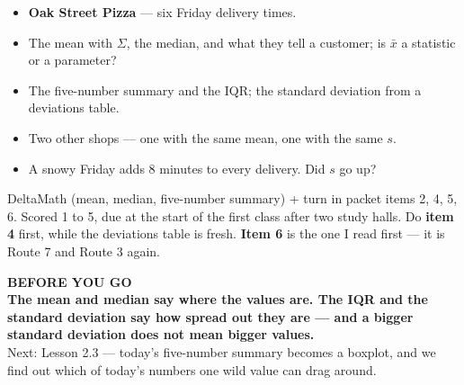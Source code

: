 \documentclass[aspectratio=169, 11pt]{beamer}
\begin{document}
\begin{frame}[t, plain]
  \begin{itemize}\setlength{\itemsep}{4pt}
    \item \textbf{Oak Street Pizza} --- six Friday delivery times.
    \item The mean with $\Sigma$, the median, and what they tell a customer; is $\bar{x}$ a
          statistic or a parameter?
    \item The five-number summary and the IQR; the standard deviation from a deviations table.
    \item Two other shops --- one with the same mean, one with the same $s$.
    \item A snowy Friday adds 8 minutes to every delivery. Did $s$ go up?
  \end{itemize}
  \begin{block}{DeltaMath (mean, median, five-number summary) + turn in packet items 2, 4, 5, 6. Scored 1 to 5, due at the start of the first class after two study halls.}
    Do \textbf{item 4} first, while the deviations table is fresh. \textbf{Item 6} is the
    one I read first --- it is Route 7 and Route 3 again.
  \end{block}
\end{frame}

{
\begin{frame}[plain]
  \vspace{1.5cm}\hspace{0.8cm}%
  \begin{minipage}{0.86\textwidth}
    {\color{goldacc}\bfseries\small BEFORE YOU GO}\\[0.7cm]
    {\color{white}\bfseries\Large The mean and median say where the values are. The IQR and
    the standard deviation say how spread out they are --- and a bigger standard deviation does
    not mean bigger values.}\\[0.9cm]
    {\color{frostmid}\small Next: Lesson 2.3 --- today's five-number summary becomes a boxplot,
    and we find out which of today's numbers one wild value can drag around.}
  \end{minipage}
\end{frame}
}
\end{document}
